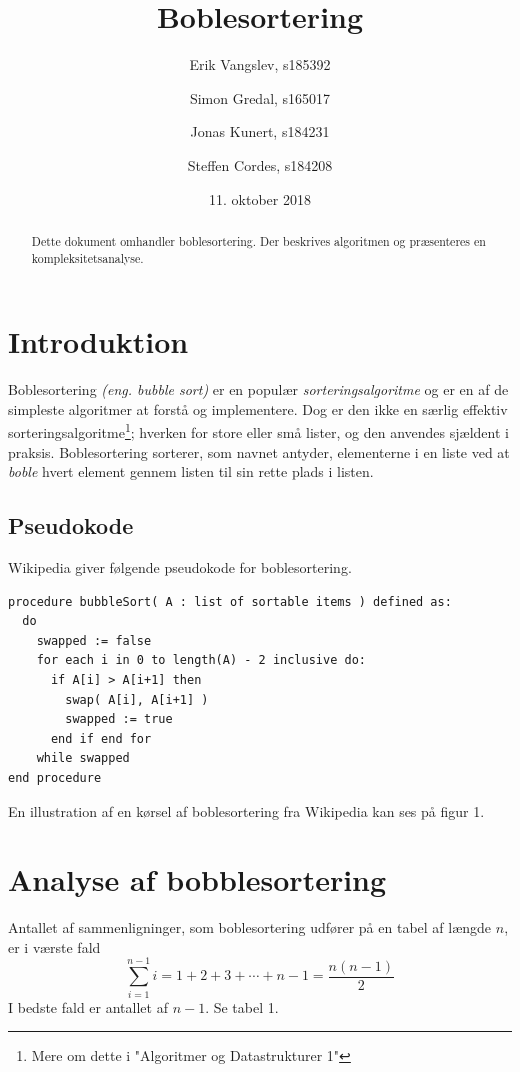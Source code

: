 \documentclass[a4paper]{article}
\begin{document}
\title{Boblesortering}
\author{
   Erik Vangslev, s185392
   \and
   Simon Gredal, s165017
   \and
   Jonas Kunert, s184231
   \and
   Steffen Cordes, s184208}
\date{11. oktober 2018}
\maketitle

\begin{abstract}
Dette dokument omhandler boblesortering. Der beskrives algoritmen og præsenteres en kompleksitetsanalyse.
\end{abstract}

\section{Introduktion}
Boblesortering \textit{(eng. bubble sort)} er en populær \textit{sorteringsalgoritme} og er en af de simpleste algoritmer at forstå og implementere. Dog er den ikke en særlig effektiv sorteringsalgoritme\footnote{Mere om dette i "Algoritmer og Datastrukturer 1"}; hverken for store eller små lister, og den anvendes sjældent i praksis. Boblesortering sorterer, som navnet antyder, elementerne i en liste ved at \textit{boble} hvert element gennem listen til sin rette plads i listen.

\subsection{Pseudokode}
Wikipedia \cite{WikiBubble} giver følgende pseudokode for boblesortering.

\begin{verbatim}
procedure bubbleSort( A : list of sortable items ) defined as:
  do
    swapped := false
    for each i in 0 to length(A) - 2 inclusive do:
      if A[i] > A[i+1] then
        swap( A[i], A[i+1] )
        swapped := true
      end if end for
    while swapped
end procedure
\end{verbatim}
En illustration af en kørsel af boblesortering fra Wikipedia kan ses på figur 1.

\section{Analyse af bobblesortering}
Antallet af sammenligninger, som boblesortering udfører på en tabel af længde \(n\),
er i værste fald
\[ 
\displaystyle\sum_{i=1}^{n-1} i = 1 + 2 + 3 + \cdots + n - 1 = \frac{n(n - 1)}{2}
\]
I bedste fald er antallet af \(n-1\). Se tabel 1.
\end{document}
